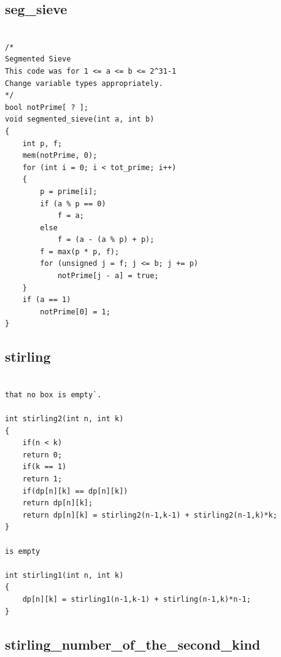 \documentclass[9pt, landscape, a4paper,twosided]{extarticle}
\begin{document}
\begin{multicols*}{3}
\subsection{seg\_sieve}
\begin{verbatim}

/*
Segmented Sieve
This code was for 1 <= a <= b <= 2^31-1
Change variable types appropriately.
*/
bool notPrime[ ? ];
void segmented_sieve(int a, int b)
{
    int p, f;
    mem(notPrime, 0);
    for (int i = 0; i < tot_prime; i++)
    {
        p = prime[i];
        if (a % p == 0)
            f = a;
        else
            f = (a - (a % p) + p);
        f = max(p * p, f);
        for (unsigned j = f; j <= b; j += p)
            notPrime[j - a] = true;
    }
    if (a == 1)
        notPrime[0] = 1;
}
\end{verbatim}

\subsection{stirling}
\begin{verbatim}

that no box is empty`.

int stirling2(int n, int k)
{
	if(n < k)
	return 0;
	if(k == 1)
	return 1;
	if(dp[n][k] == dp[n][k])
	return dp[n][k];
	return dp[n][k] = stirling2(n-1,k-1) + stirling2(n-1,k)*k;
}

is empty

int stirling1(int n, int k)
{
	dp[n][k] = stirling1(n-1,k-1) + stirling(n-1,k)*n-1;
}
\end{verbatim}

\subsection{stirling\_number\_of\_the\_second\_kind}
\begin{verbatim}


\end{verbatim}
\end{multicols*}
\end{document}
